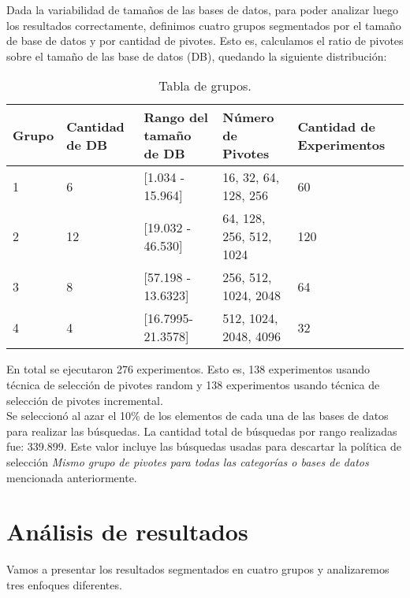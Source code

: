 Dada la variabilidad de tamaños de las bases de datos, para poder analizar luego los resultados correctamente, definimos cuatro grupos segmentados por el tamaño de base de datos y por cantidad de pivotes. Esto es, calculamos el ratio de pivotes sobre el tamaño de las base de datos (DB), quedando la siguiente distribuci\'on:\\

\begin{table}[htbp]
\begin{center}
\begin{tabular}{|p{1.1cm}|p{1.8cm}|p{3.2cm}|p{2.2cm}|p{2.5cm}|}
\hline
Grupo & 
Cantidad de DB & 
Rango del tama\~no de DB & 
N\'umero de Pivotes &  
Cantidad de Experimentos\\
\hline \hline
1 & 
6 & 
[1.034 - 15.964] & 
16, 32, 64, 128, 256 & 
60  \\ \hline
2 &
12 &
[19.032 - 46.530] &
64, 128, 256, 512, 1024 &
120  \\ \hline
3 &
8 &
[57.198 - 13.6323] &
256, 512, 1024, 2048 &
64  \\ \hline
4 &
4 &
[16.7995- 21.3578] &
512, 1024, 2048, 4096 &
32  \\ \hline
\end{tabular}
\caption{Tabla de grupos.}
\label{tabla:grupos}
\end{center}
\end{table}

En total se ejecutaron 276 experimentos. Esto es, 138 experimentos usando t\'ecnica de selecci\'on de pivotes random y 138 experimentos usando t\'ecnica de selecci\'on de pivotes incremental.\\

Se seleccion\'o al azar el 10\% de los elementos de cada una de las bases de datos para realizar las b\'usquedas. La cantidad total de b\'usquedas por rango realizadas fue: 339.899. Este valor incluye las b\'usquedas usadas para descartar la pol\'itica de selecci\'on \textit{Mismo grupo de pivotes para todas las categor\'ias o bases de datos} mencionada anteriormente.\\

\section{An\'alisis de resultados}

Vamos a presentar los resultados segmentados en cuatro grupos y analizaremos tres enfoques diferentes.\\

